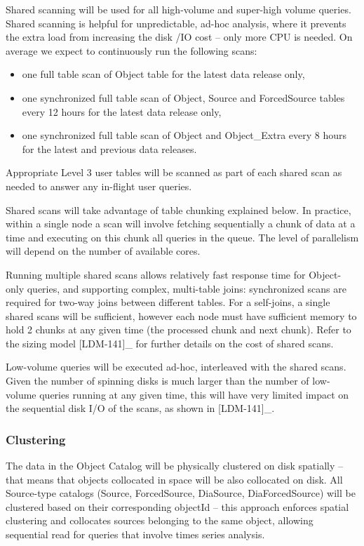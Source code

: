 \documentclass[DM,lsstdraft,toc]{lsstdoc}
\begin{document}
Shared scanning will be used for all high-volume and super-high volume
queries. Shared scanning is helpful for unpredictable, ad-hoc analysis,
where it prevents the extra load from increasing the disk /IO cost --
only more CPU is needed. On average we expect to continuously run the
following scans:

\begin{itemize}
\item
  one full table scan of Object table for the latest data release only,
\item
  one synchronized full table scan of Object, Source and ForcedSource
  tables every 12 hours for the latest data release only,
\item
  one synchronized full table scan of Object and Object\_Extra every 8
  hours for the latest and previous data releases.
\end{itemize}

Appropriate Level 3 user tables will be scanned as part of each shared
scan as needed to answer any in-flight user queries.

Shared scans will take advantage of table chunking explained below. In
practice, within a single node a scan will involve fetching sequentially
a chunk of data at a time and executing on this chunk all queries in the
queue. The level of parallelism will depend on the number of available
cores.

Running multiple shared scans allows relatively fast response time for
Object-only queries, and supporting complex, multi-table joins:
synchronized scans are required for two-way joins between different
tables. For a self-joins, a single shared scans will be sufficient,
however each node must have sufficient memory to hold 2 chunks at any
given time (the processed chunk and next chunk). Refer to the sizing
model {[}LDM-141{]}\_ for further details on the cost of shared scans.

Low-volume queries will be executed ad-hoc, interleaved with the shared
scans. Given the number of spinning disks is much larger than the number
of low-volume queries running at any given time, this will have very
limited impact on the sequential disk I/O of the scans, as shown in
{[}LDM-141{]}\_.

\subsubsection{Clustering}\label{clustering}

The data in the Object Catalog will be physically clustered on disk
spatially -- that means that objects collocated in space will be also
collocated on disk. All Source-type catalogs (Source, ForcedSource,
DiaSource, DiaForcedSource) will be clustered based on their
corresponding objectId -- this approach enforces spatial clustering and
collocates sources belonging to the same object, allowing sequential
read for queries that involve times series analysis.
\end{document}
